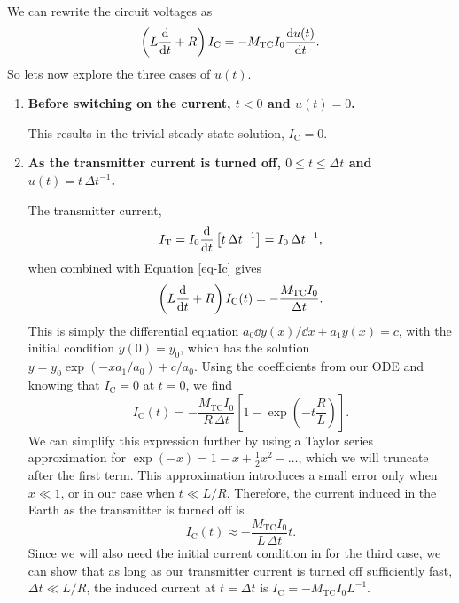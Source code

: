 We can rewrite the circuit voltages as
\begin{equation}
    \left( L \dv{}{t} + R \right) I_{\mathrm{C}} = 
        - M_{\mathrm{TC}} I_{0} \dv{u(t)}{t}.
    \label{eq-Ic}
\end{equation}
So lets now explore the three cases of $u(t)$.
\begin{enumerate}
    \item {\bf Before switching on the current, $t < 0$ and $u(t) = 0$.}

    This results in the trivial steady-state solution, $I_{\mathrm{C}} = 0$.

    \item {\bf As the transmitter current is turned off, $0 \leq t \leq \Delta
    t$ and $u(t) = t\, \Delta t^{-1}$.}

    The transmitter current,
    \begin{equation*}
        I_{\mathrm{T}} = I_{0} \dv{}{t} \left[ t\, \Delta t^{-1} \right] =
            I_{0}\, \Delta t^{-1},
    \end{equation*}
    when combined with Equation \ref{eq-Ic} gives
    \begin{equation*}
        \left(L \dv{}{t} + R \right) I_{\mathrm{C}}(t) 
            = - \frac{M_{\mathrm{TC}} I_0}{\Delta t}.
    \end{equation*}
    This is simply the differential equation $a_{0} \dd{y(x)}/\dd{x} + a_{1} y(x)
    = c$, with the initial condition $y(0) = y_{0}$, which has the solution $y =
    y_{0} \exp(-x a_{1}/a_{0}) + c/a_{0}$.  Using the coefficients from our ODE
    and knowing that $I_{\mathrm{C}} = 0$ at $t = 0$, we find
    \begin{equation*}
        I_{\mathrm{C}}(t) = - \frac{M_{\mathrm{TC}} I_0}{R\, \Delta t}
            \left[ 1 - \exp \left( -t \frac{R}{L} \right) \right].
    \end{equation*}
    We can simplify this expression further by using a Taylor series
    approximation for $\exp(-x) = 1 - x + \frac{1}{2}x^2 - \ldots$, which we will
    truncate after the first term.  This approximation introduces a small error
    only when $x \ll 1$, or in our case when $t \ll L/R$.  Therefore, the
    current induced in the Earth as the transmitter is turned off is
    \begin{equation}
        I_{\mathrm{C}}(t) \approx - \frac{M_{\mathrm{TC}} I_0}{L\, \Delta t} t.
    \end{equation}
    Since we will also need the initial current condition in for the third case,
    we can show that as long as our transmitter current is turned off
    sufficiently fast, $\Delta t \ll L/R$, the induced current at $t = \Delta t$
    is $I_{\mathrm{C}} = - M_{\mathrm{TC}} I_0 L^{-1}$.


\end{enumerate}
